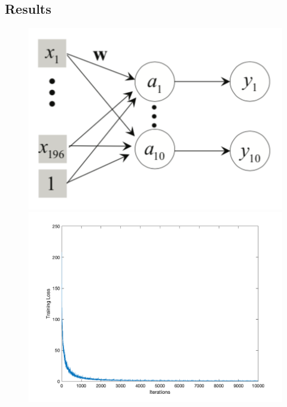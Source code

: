 \documentclass[letter, 11pt]{article}
\begin{document}
\subsection*{Results}
\begin{figure}[H]
        \centering
        \includegraphics[width=\textwidth]{HW4/RESULT/SLP_linear.png}
    \endminipage\hfill
        \centering
        \includegraphics[width=1.1\textwidth]{HW4/RESULT/SLP_linear_loss.png}
    \endminipage\hfill
        \centering

\end{figure}
\end{document}
